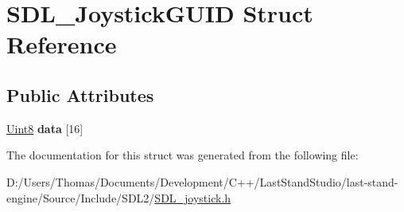 \hypertarget{structSDL__JoystickGUID}{}\section{S\+D\+L\+\_\+\+Joystick\+G\+U\+I\+D Struct Reference}
\label{structSDL__JoystickGUID}
\subsection*{Public Attributes}
\begin{DoxyCompactItemize}
\item 
\hypertarget{structSDL__JoystickGUID_a16935b928a608fe98e0509f242590597}{}\hyperlink{SDL__stdinc_8h_a2944638813a090aa23e62f4da842c3e2}{Uint8} {\bfseries data} \mbox{[}16\mbox{]}\label{structSDL__JoystickGUID_a16935b928a608fe98e0509f242590597}

\end{DoxyCompactItemize}


The documentation for this struct was generated from the following file\+:\begin{DoxyCompactItemize}
\item 
D\+:/\+Users/\+Thomas/\+Documents/\+Development/\+C++/\+Last\+Stand\+Studio/last-\/stand-\/engine/\+Source/\+Include/\+S\+D\+L2/\hyperlink{SDL__joystick_8h}{S\+D\+L\+\_\+joystick.\+h}\end{DoxyCompactItemize}

